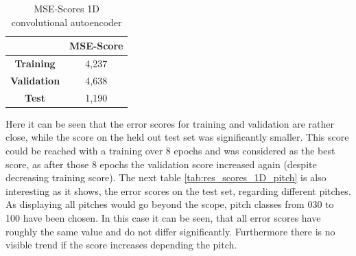 \begin{table}[htb!]
    \centering
    \begin{tabular}{|c|c|}
        \hline
         & \textbf{MSE-Score} \\
         \hline
        \textbf{Training} & 4,237 \\
        \hline
        \textbf{Validation} & 4,638 \\
        \hline
        \textbf{Test} & 1,190 \\
        \hline
    \end{tabular}
    \caption{MSE-Scores 1D convolutional autoencoder}
    \label{tab:res_scores_1Dcae}
\end{table}

Here it can be seen that the error scores for training and validation are rather close, while the score on the held out test set was significantly smaller. This score could be reached with a training over 8 epochs and was considered as the best score, as after those 8 epochs the validation score increased again (despite decreasing training score). The next table \ref{tab:res_scores_1D_pitch} is also interesting as it shows, the error scores on the test set, regarding different pitches. As displaying all pitches would go beyond the scope, pitch classes from 030 to 100 have been chosen. In this case it can be seen, that all error scores have roughly the same value and do not differ significantly. Furthermore there is no visible trend if the score increases depending the pitch.

